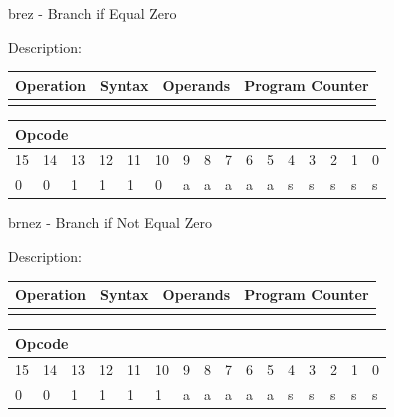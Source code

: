 \documentclass[%
	pdftex,
	a4paper,
	oneside,
	bibtotoc,%
	idxtotoc,%
	bibtotocnumbered,
	halfparskip,%
]{scrbook}
\begin{document}
\bigskip

brez - Branch if Equal Zero

Description:

\begin{tabular}{|l|l|l|l|}
\hline
Operation & Syntax & Operands & Program Counter \\ \hline
&  &  &  \\ \hline
\end{tabular}

\begin{tabular}{|c|c|c|c|c|c|c|c|c|c|c|c|c|c|c|c|}
\hline
\multicolumn{6}{|l|}{Opcode} & \multicolumn{5}{|l|}{} & \multicolumn{5}{|l|}{
} \\ \hline
15 & 14 & 13 & 12 & 11 & 10 & 9 & 8 & 7 & 6 & 5 & 4 & 3 & 2 & 1 & 0 \\ \hline
\multicolumn{1}{|l|}{0} & \multicolumn{1}{|l|}{0} & \multicolumn{1}{|l|}{1}
& \multicolumn{1}{|l|}{1} & \multicolumn{1}{|l|}{1} & \multicolumn{1}{|l|}{0}
& \multicolumn{1}{|l|}{a} & \multicolumn{1}{|l|}{a} & \multicolumn{1}{|l|}{a}
& \multicolumn{1}{|l|}{a} & \multicolumn{1}{|l|}{a} & \multicolumn{1}{|l|}{s}
& \multicolumn{1}{|l|}{s} & \multicolumn{1}{|l|}{s} & \multicolumn{1}{|l|}{s}
& \multicolumn{1}{|l|}{s} \\ \hline
\end{tabular}

\bigskip

brnez - Branch if Not Equal Zero

Description:

\begin{tabular}{|l|l|l|l|}
\hline
Operation & Syntax & Operands & Program Counter \\ \hline
&  &  &  \\ \hline
\end{tabular}

\begin{tabular}{|c|c|c|c|c|c|c|c|c|c|c|c|c|c|c|c|}
\hline
\multicolumn{6}{|l|}{Opcode} & \multicolumn{5}{|l|}{} & \multicolumn{5}{|l|}{
} \\ \hline
15 & 14 & 13 & 12 & 11 & 10 & 9 & 8 & 7 & 6 & 5 & 4 & 3 & 2 & 1 & 0 \\ \hline
\multicolumn{1}{|l|}{0} & \multicolumn{1}{|l|}{0} & \multicolumn{1}{|l|}{1}
& \multicolumn{1}{|l|}{1} & \multicolumn{1}{|l|}{1} & \multicolumn{1}{|l|}{1}
& \multicolumn{1}{|l|}{a} & \multicolumn{1}{|l|}{a} & \multicolumn{1}{|l|}{a}
& \multicolumn{1}{|l|}{a} & \multicolumn{1}{|l|}{a} & \multicolumn{1}{|l|}{s}
& \multicolumn{1}{|l|}{s} & \multicolumn{1}{|l|}{s} & \multicolumn{1}{|l|}{s}
& \multicolumn{1}{|l|}{s} \\ \hline
\end{tabular}
\end{document}
